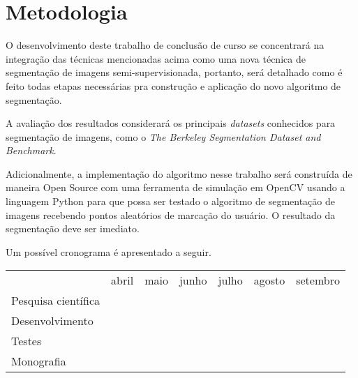 \chapter{Metodologia}\label{cap:metodologia}

O desenvolvimento deste trabalho de conclusão de curso se concentrará
na integração das técnicas mencionadas acima como uma nova técnica
de segmentação de imagens semi-supervisionada, portanto, será detalhado como é
feito todas etapas necessárias pra construção e aplicação do novo
algoritmo de segmentação.

A avaliação dos resultados considerará os principais \textit{datasets}
conhecidos para segmentação de imagens, como o
\textit{The Berkeley Segmentation Dataset and
  Benchmark}\cite{MartinFTM01}.

Adicionalmente, a implementação do algoritmo nesse trabalho será construída de
maneira Open Source com uma ferramenta de simulação em OpenCV usando a
linguagem Python para que possa ser testado o algoritmo de segmentação
de imagens recebendo pontos aleatórios de marcação do usuário. O
resultado da segmentação deve ser imediato.

Um possível cronograma é apresentado a seguir.

\begin{table}[h]
\begin{tabular}{lllllll}
                    & abril                                        & maio                                            & junho                                           & julho                                           & agosto                                          & setembro                                        \\
Pesquisa científica & \multicolumn{1}{c}{\cellcolor[HTML]{000000}} & \cellcolor[HTML]{000000}{\color[HTML]{000000} } & \cellcolor[HTML]{000000}{\color[HTML]{000000} } &                                                 &                                                 &                                                 \\
Desenvolvimento     &                                              &                                                 & \cellcolor[HTML]{000000}{\color[HTML]{000000} } & \cellcolor[HTML]{000000}{\color[HTML]{000000} } &                                                 &                                                 \\
Testes              &                                              &                                                 &                                                 & \cellcolor[HTML]{000000}{\color[HTML]{000000} } & \cellcolor[HTML]{000000}{\color[HTML]{000000} } &                                                 \\
Monografia          &                                              &                                                 &                                                 &                                                 & \cellcolor[HTML]{000000}{\color[HTML]{000000} } & \cellcolor[HTML]{000000}{\color[HTML]{000000} }
\end{tabular}
\end{table}
